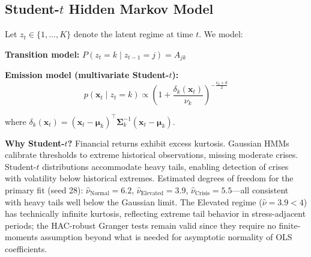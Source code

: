 \documentclass[sigconf,anonymous]{acmart}
\begin{document}
\subsection{Student-\texorpdfstring{$t$}{t} Hidden Markov Model}
\label{sec:hmm}

Let $z_t \in \{1, \ldots, K\}$ denote the latent regime at time $t$. We model:

\textbf{Transition model:}
$P(z_t = k \mid z_{t-1} = j) = A_{jk}$

\textbf{Emission model (multivariate Student-$t$):}
\begin{equation}
p(\mathbf{x}_t \mid z_t = k) \propto \left(1 + \frac{\delta_k(\mathbf{x}_t)}{\nu_k}\right)^{-\frac{\nu_k+d}{2}}
\end{equation}

where $\delta_k(\mathbf{x}_t) = (\mathbf{x}_t - \boldsymbol{\mu}_k)^\top\boldsymbol{\Sigma}_k^{-1}(\mathbf{x}_t - \boldsymbol{\mu}_k)$.

\textbf{Why Student-$t$?} Financial returns exhibit excess kurtosis. Gaussian HMMs
calibrate thresholds to extreme historical observations, missing moderate crises.
Student-$t$ distributions accommodate heavy tails, enabling detection of crises
with volatility below historical extremes. Estimated degrees of freedom for the
primary fit (seed 28): $\hat{\nu}_{\text{Normal}} = 6.2$, $\hat{\nu}_{\text{Elevated}} = 3.9$,
$\hat{\nu}_{\text{Crisis}} = 5.5$---all consistent with heavy tails well below
the Gaussian limit. The Elevated regime ($\hat\nu = 3.9 < 4$) has technically
infinite kurtosis, reflecting extreme tail behavior in stress-adjacent periods;
the HAC-robust Granger tests remain valid since they require no finite-moments
assumption beyond what is needed for asymptotic normality of OLS coefficients.
\end{document}
